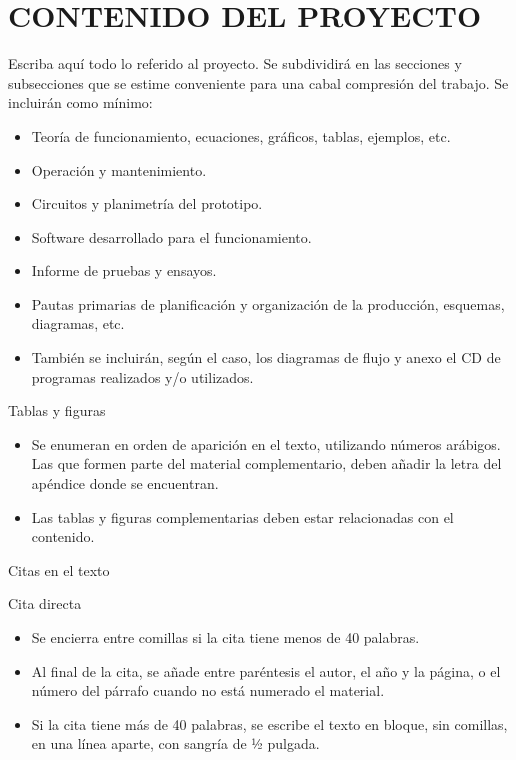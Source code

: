 \section*{CONTENIDO DEL PROYECTO}
\justifying

Escriba aquí todo lo referido al proyecto. Se subdividirá en las secciones y subsecciones que se estime conveniente para una cabal compresión del trabajo. Se incluirán como mínimo:

\begin{itemize}
    \item Teoría de funcionamiento, ecuaciones, gráficos, tablas, ejemplos, etc.
    \item Operación y mantenimiento.
    \item Circuitos y planimetría del prototipo.
    \item Software desarrollado para el funcionamiento.
    \item Informe de pruebas y ensayos.
    \item Pautas primarias de planificación y organización de la producción, esquemas, diagramas, etc.
    \item También se incluirán, según el caso, los diagramas de flujo y anexo el CD de programas realizados y/o utilizados.
\end{itemize}

Tablas y figuras
\begin{itemize}
    \item Se enumeran en orden de aparición en el texto, utilizando números arábigos. Las que formen parte del material complementario, deben añadir la letra del apéndice donde se encuentran.
    \item Las tablas y figuras complementarias deben estar relacionadas con el contenido.
\end{itemize}

Citas en el texto

Cita directa
\begin{itemize}
    \item Se encierra entre comillas si la cita tiene menos de 40 palabras.
    \item Al final de la cita, se añade entre paréntesis el autor, el año y la página, o el número del párrafo cuando no está numerado el material.
    \item Si la cita tiene más de 40 palabras, se escribe el texto en bloque, sin comillas, en una línea aparte, con sangría de ½ pulgada.
\end{itemize}

